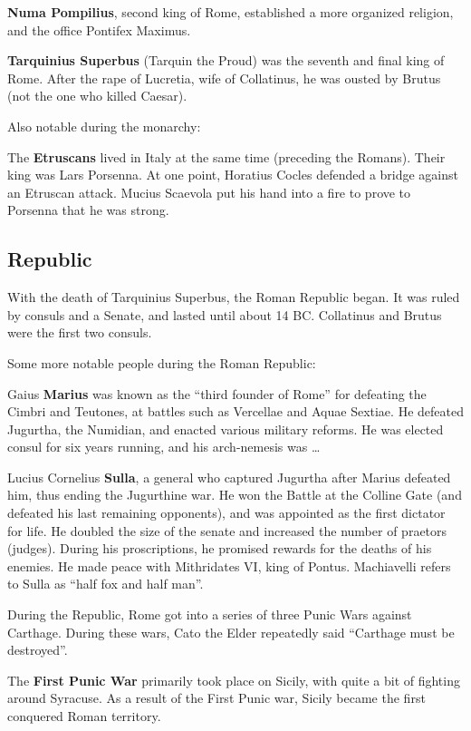 \textbf{Numa Pompilius}, second king of Rome, established a more organized religion, and the office Pontifex Maximus.

\textbf{Tarquinius Superbus} (Tarquin the Proud) was the seventh and final king of Rome.
After the rape of Lucretia, wife of Collatinus, he was ousted by Brutus (not the one who killed Caesar).

Also notable during the monarchy:

The \textbf{Etruscans} lived in Italy at the same time (preceding the Romans).
Their king was Lars Porsenna.
At one point, Horatius Cocles defended a bridge against an Etruscan attack.
Mucius Scaevola put his hand into a fire to prove to Porsenna that he was strong.

\subsection*{Republic}

With the death of Tarquinius Superbus, the Roman Republic began.
It was ruled by consuls and a Senate, and lasted until about 14 BC\@.
Collatinus and Brutus were the first two consuls.

Some more notable people during the Roman Republic:

Gaius \textbf{Marius} was known as the ``third founder of Rome'' for defeating the Cimbri and Teutones,
at battles such as Vercellae and Aquae Sextiae.
He defeated Jugurtha, the Numidian, and enacted various military reforms.
He was elected consul for six years running, and his arch-nemesis was \ldots

Lucius Cornelius \textbf{Sulla}, a general who captured Jugurtha after Marius defeated him,
thus ending the Jugurthine war.
He won the Battle at the Colline Gate (and defeated his last remaining opponents),
and was appointed as the first dictator for life.
He doubled the size of the senate and increased the number of praetors (judges).
During his proscriptions, he promised rewards for the deaths of his enemies.
He made peace with Mithridates VI, king of Pontus.
Machiavelli refers to Sulla as ``half fox and half man''.

During the Republic, Rome got into a series of three Punic Wars against Carthage.
During these wars, Cato the Elder repeatedly said ``Carthage must be destroyed''.

The \textbf{First Punic War} primarily took place on Sicily, with quite a bit of fighting around Syracuse.
As a result of the First Punic war, Sicily became the first conquered Roman territory.

